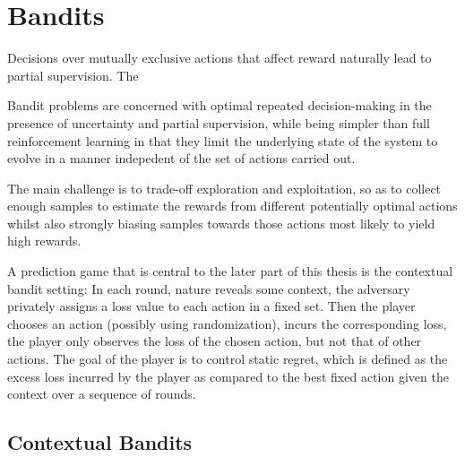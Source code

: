 
\section{Bandits}

Decisions over mutually exclusive actions that affect reward naturally lead to partial supervision.
The 

Bandit problems are concerned with optimal repeated decision-making in the presence of uncertainty and partial supervision, while being simpler than full reinforcement learning in that they limit the underlying state of the system to evolve in a manner indepedent of the set of actions carried out. 


The main challenge is to trade-off exploration and exploitation, so as to collect enough samples to estimate the rewards from different potentially optimal actions whilst also strongly biasing samples towards those actions most likely to yield high rewards.  

 A prediction game that is central to the later part of this thesis is the contextual bandit setting: In each round, nature reveals some context, the adversary privately assigns a loss value to each action in a fixed set.
 Then the player chooses an action (possibly using randomization), incurs the corresponding loss, the player only observes the loss of the chosen action, but not that of other actions.
 The goal of the player is to control static regret, which is defined as the excess loss incurred by the player as compared to the best fixed action given the context over a sequence of rounds.


\subsection{Contextual Bandits}




